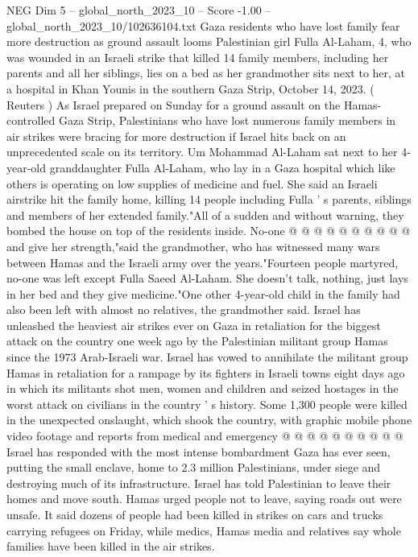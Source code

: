 \begin{textsample}{NEG Dim 5 – global\_north\_2023\_10 – Score -1.00 – global\_north\_2023\_10/102636104.txt}  \label{ex:f5_neg_029}
Gaza residents who have lost family fear more destruction as ground assault looms Palestinian girl Fulla Al-Laham, 4, who was wounded in an Israeli strike that killed 14 family members, including her parents and all her siblings, lies on a bed as her grandmother sits next to her, at a hospital in Khan Younis in the southern Gaza Strip, October 14, 2023. ( Reuters ) As Israel prepared on Sunday for a ground assault on the Hamas-controlled Gaza Strip, Palestinians who have lost numerous family members in air strikes were bracing for more destruction if Israel hits back on an unprecedented scale on its territory.
Um Mohammad Al-Laham sat next to her 4-year-old granddaughter Fulla Al-Laham, who lay in a Gaza hospital which like others is operating on low supplies of medicine and fuel.
She said an Israeli airstrike hit the family home, killing 14 people including Fulla ' s parents, siblings and members of her extended family."All of a sudden and without warning, they bombed the house on top of the residents inside.
No-one @ @ @ @ @ @ @ @ @ @ and give her strength,"said the grandmother, who has witnessed many wars between Hamas and the Israeli army over the years."Fourteen people martyred, no-one was left except Fulla Saeed Al-Laham.
She doesn't talk, nothing, just lays in her bed and they give medicine."One other 4-year-old child in the family had also been left with almost no relatives, the grandmother said.
Israel has unleashed the heaviest air strikes ever on Gaza in retaliation for the biggest attack on the country one week ago by the Palestinian militant group Hamas since the 1973 Arab-Israeli war.
Israel has vowed to annihilate the militant group Hamas in retaliation for a rampage by its fighters in Israeli towns eight days ago in which its militants shot men, women and children and seized hostages in the worst attack on civilians in the country ' s history.
Some 1,300 people were killed in the unexpected onslaught, which shook the country, with graphic mobile phone video footage and reports from medical and emergency @ @ @ @ @ @ @ @ @ @ Israel has responded with the most intense bombardment Gaza has ever seen, putting the small enclave, home to 2.3 million Palestinians, under siege and destroying much of its infrastructure.
Israel has told Palestinian to leave their homes and move south.
Hamas urged people not to leave, saying roads out were unsafe.
It said dozens of people had been killed in strikes on cars and trucks carrying refugees on Friday, while medics, Hamas media and relatives say whole families have been killed in the air strikes.

\end{textsample}
